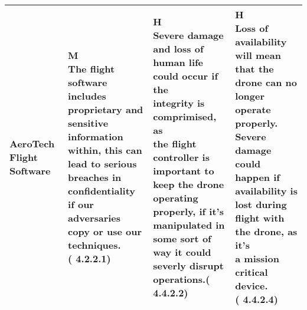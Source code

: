 \begin{center}
\begin{tabular}{|p{4cm}|p{3.5cm}|p{3.5cm}|p{3.5cm}|}
    \makecell{AeroTech Flight\\ Software} & 
    \makecell[l]{M\\ \scriptsize The flight software includes \\ \scriptsize proprietary and sensitive \\ \scriptsize information within, this can \\ \scriptsize lead to serious breaches in \\ \scriptsize confidentiality if our \\ \scriptsize adversaries copy or use our \\ \scriptsize techniques.\\ \scriptsize (\cite{nistsp80060v1r1} 4.2.2.1)} & 
    \makecell[l]{H\\ \scriptsize Severe damage and loss of \\ \scriptsize human life could occur if the \\ \scriptsize integrity is comprimised, as \\ \scriptsize the flight controller is \\ \scriptsize important to keep the drone \\ \scriptsize operating properly, if it's \\ \scriptsize manipulated in some sort of \\ \scriptsize way it could severly disrupt \\ \scriptsize operations.\scriptsize (\cite{nistsp80060v1r1} 4.4.2.2)} & 
    \makecell[l]{H\\ \scriptsize Loss of availability will mean \\ \scriptsize that the drone can no longer \\ \scriptsize operate properly. Severe \\ \scriptsize damage could happen if \\ \scriptsize availability is lost during \\ \scriptsize flight with the drone, as it's \\ \scriptsize a mission critical device. \\\scriptsize (\cite{nistsp80060v1r1} 4.4.2.4)} \\ \hline
    

\end{tabular}
\end{center}

